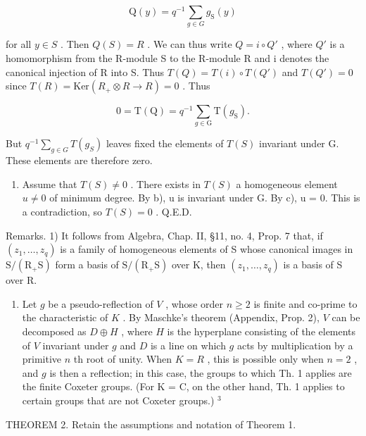 \[
\mathrm{Q} (y) = q ^ {- 1} \sum_ {g \in G} g _ {\mathrm{S}} (y)
\]

for all \(y \in S\) . Then \(Q(S) = R\) . We can thus write \(Q = i \circ Q'\) , where \(Q'\) is a homomorphism from the R-module S to the R-module R and i denotes the canonical injection of R into S. Thus \(T(Q) = T(i) \circ T(Q')\) and \(T(Q') = 0\) since \(T(R) = \text{Ker}(R_{+} \otimes R \to R) = 0\) . Thus

\[
0 = \mathrm{T} (\mathrm{Q}) = q ^ {- 1} \sum_ {g \in \mathrm{G}} \mathrm{T} (g _ {\mathrm{S}}).
\]

But \(q^{-1} \sum_{g \in G} T(g_S)\) leaves fixed the elements of \(T(S)\) invariant under G. These elements are therefore zero.

\begin{enumerate}
\def\labelenumi{\alph{enumi})}
\setcounter{enumi}{3}
\tightlist
\item
  Assume that \(T(S) \neq 0\) . There exists in \(T(S)\) a homogeneous element \(u \neq 0\) of minimum degree. By b), u is invariant under G. By c), u = 0. This is a contradiction, so \(T(S) = 0\) . Q.E.D.
\end{enumerate}

Remarks. 1) It follows from Algebra, Chap. II, §11, no. 4, Prop. 7 that, if \((z_{1},\ldots ,z_{q})\) is a family of homogeneous elements of S whose canonical images in \(\mathrm{S / (R_+S)}\) form a basis of \(\mathrm{S / (R_+S)}\) over K, then \((z_{1},\ldots ,z_{q})\) is a basis of S over R.

\begin{enumerate}
\def\labelenumi{\arabic{enumi})}
\setcounter{enumi}{1}
\tightlist
\item
  Let \(g\) be a pseudo-reflection of \(V\) , whose order \(n \geqslant 2\) is finite and co-prime to the characteristic of \(K\) . By Maschke's theorem (Appendix, Prop. 2), \(V\) can be decomposed as \(D \oplus H\) , where \(H\) is the hyperplane consisting of the elements of \(V\) invariant under \(g\) and \(D\) is a line on which \(g\) acts by multiplication by a primitive \(n\) th root of unity. When \(K = R\) , this is possible only when \(n = 2\) , and \(g\) is then a reflection; in this case, the groups to which Th. 1 applies are the finite Coxeter groups. (For K = C, on the other hand, Th. 1 applies to certain groups that are not Coxeter groups.) \(^{3}\)
\end{enumerate}

THEOREM 2. Retain the assumptions and notation of Theorem 1.

